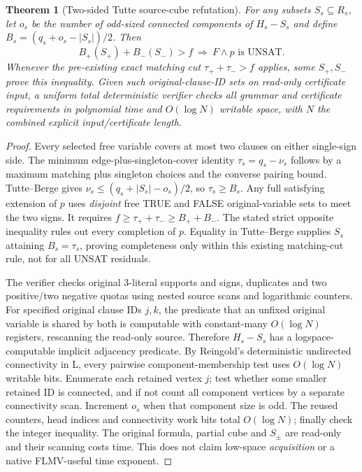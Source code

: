\documentclass[10pt]{article}
\newtheorem{theorem}{Theorem}
\begin{document}
\begin{theorem}[Two-sided Tutte source-cube refutation]
For any subsets $S_s\subseteq R_s$, let $o_s$ be the number of odd-sized connected components of $H_s-S_s$ and define $B_s=(q_s+o_s-|S_s|)/2$. Then
\[
\boxed{B_+(S_+)+B_-(S_-)>f
\ \Longrightarrow\ F\wedge p\text{ is UNSAT}.}
\]
Whenever the pre-existing exact matching cut $\tau_++\tau_->f$ applies, some $S_+,S_-$ prove this inequality. Given such original-clause-ID sets on read-only certificate input, a uniform total deterministic verifier checks all grammar and certificate requirements in polynomial time and $O(\log N)$ writable space, with $N$ the combined explicit input/certificate length.
\end{theorem}
\begin{proof}
Every selected free variable covers at most two clauses on either single-sign side. The minimum edge-plus-singleton-cover identity $\tau_s=q_s-\nu_s$ follows by a maximum matching plus singleton choices and the converse pairing bound. Tutte--Berge gives $\nu_s\le(q_s+|S_s|-o_s)/2$, so $\tau_s\ge B_s$. Any full satisfying extension of $p$ uses \emph{disjoint} free TRUE and FALSE original-variable sets to meet the two signs. It requires $f\ge\tau_++\tau_-\ge B_++B_-$. The stated strict opposite inequality rules out every completion of $p$. Equality in Tutte--Berge supplies $S_s$ attaining $B_s=\tau_s$, proving completeness only within this existing matching-cut rule, not for all UNSAT residuals.

The verifier checks original 3-literal supports and signs, duplicates and two positive/two negative quotas using nested source scans and logarithmic counters. For specified original clause IDs $j,k$, the predicate that an unfixed original variable is shared by both is computable with constant-many $O(\log N)$ registers, rescanning the read-only source. Therefore $H_s-S_s$ has a logspace-computable implicit adjacency predicate. By Reingold's deterministic undirected connectivity in L, every pairwise component-membership test uses $O(\log N)$ writable bits. Enumerate each retained vertex $j$; test whether some smaller retained ID is connected, and if not count all component vertices by a separate connectivity scan. Increment $o_s$ when that component size is odd. The reused counters, head indices and connectivity work bits total $O(\log N)$; finally check the integer inequality. The original formula, partial cube and $S_\pm$ are read-only and their scanning costs time. This does not claim low-space \emph{acquisition} or a native FLMV-useful time exponent.
\end{proof}
\end{document}
